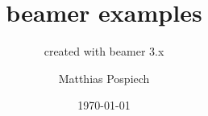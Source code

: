 \documentclass{beamer}
\begin{document}
 
\title{beamer examples}
\subtitle{created with beamer 3.x}
\author{Matthias Pospiech}
\titlegraphic{}
\date{\today}
\begin{frame}[plain]
  \titlepage
\end{frame}
\end{document}
